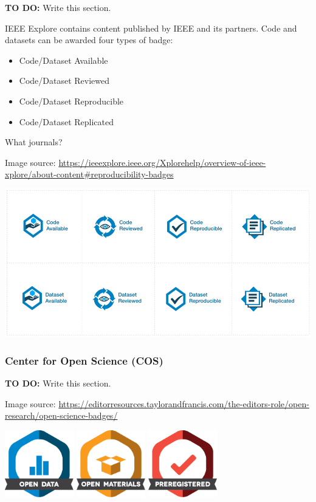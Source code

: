 \textbf{TO DO:} Write this section.

IEEE Explore contains content published by IEEE and its partners. Code and datasets can be awarded four types of badge:

\begin{itemize}
    \item Code/Dataset Available
    \item Code/Dataset Reviewed
    \item Code/Dataset Reproducible
    \item Code/Dataset Replicated
\end{itemize}

What journals?

Image source: \url{https://ieeexplore.ieee.org/Xplorehelp/overview-of-ieee-xplore/about-content#reproducibility-badges}

\includegraphics[width=15cm]{images/IEEE_reproducibility_badges.png}

\subsubsection{Center for Open Science (COS)}

\textbf{TO DO:} Write this section.

Image source: \url{https://editorresources.taylorandfrancis.com/the-editors-role/open-research/open-science-badges/}

\includegraphics[width=3cm]{images/Open-Data-OSB.png}
\includegraphics[width=3cm]{images/Open-Materials-OSB.png}
\includegraphics[width=3cm]{images/Preregistered-OSB.png}

